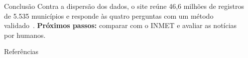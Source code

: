 \documentclass{beamer}
\newlength{\sepwidth}
\newlength{\colwidth}
\newcommand{\separatorcolumn}{\begin{column}{\sepwidth}\end{column}}
\begin{document}
\begin{frame}[t]
\begin{columns}[t]
\begin{column}{\colwidth}
			    \begin{block}{Conclusão}
			    	Contra a dispersão dos dados, o site reúne 46,6 milhões de registros de 5.535 municípios e
			    	responde às quatro perguntas com um método validado~\citep{leigh2019framework}.
			    	\textbf{Próximos passos:} comparar com o INMET e avaliar as notícias por humanos.
			    \end{block}

			    \begin{block}{Referências}
					\scriptsize{}
			    \end{block}

			\end{column}

			\separatorcolumn
		\end{columns}

	\end{frame}
\end{document}
